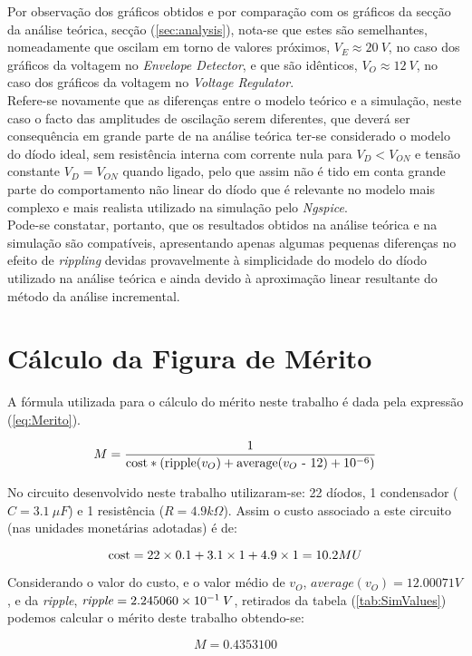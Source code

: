 Por observação dos gráficos obtidos e por comparação com os gráficos da secção da análise teórica, secção (\ref{sec:analysis}), nota-se que estes são semelhantes,
nomeadamente que oscilam em torno de valores próximos, $V_E \approx 20 \: V$, no caso dos gráficos da voltagem no \emph{Envelope Detector}, e que são idênticos, $V_O \approx 12 \: V$,
no caso dos gráficos da voltagem no \emph{Voltage Regulator}.
\\
Refere-se novamente que as diferenças entre o modelo teórico e a simulação, neste caso o facto das amplitudes de oscilação serem diferentes, que deverá ser consequência em grande parte
de na análise teórica ter-se considerado o modelo do díodo ideal, sem resistência interna com corrente nula para $V_D < V_{ON}$ e tensão constante $V_D = V_{ON}$ quando ligado, 
pelo que assim não é tido em conta grande parte do comportamento não linear do díodo que é relevante no modelo mais complexo e mais realista utilizado na simulação pelo \emph{Ngspice}.
\\
Pode-se constatar, portanto, que os resultados obtidos na análise teórica e na simulação são compatíveis, apresentando apenas algumas pequenas diferenças no
efeito de \emph{rippling} devidas provavelmente à simplicidade do modelo do díodo utilizado na análise teórica e ainda devido à aproximação linear resultante do método da análise incremental.



\section{Cálculo da Figura de Mérito}
\label{sec:Merit}

A fórmula utilizada para o cálculo do mérito neste trabalho é dada pela expressão (\ref{eq:Merito}).

\begin{equation}
    M = \frac{1}{\textnormal{cost} * (\textnormal{ripple($v_O$)} + \textnormal{average($v_O$ - 12)} + 10^{-6})}
    \label{eq:Merito}
\end{equation}

No circuito desenvolvido neste trabalho utilizaram-se: 22 díodos, 1 condensador ($C = 3.1\: \mu F$) e 1 resistência ($R = 4.9 k\Omega$). 
Assim o custo associado a este circuito (nas unidades monetárias adotadas) é de:

\begin{equation}
  \label{eq:Custo}
  \textnormal{cost} = 22 \times 0.1 + 3.1 \times 1 + 4.9 \times 1 = 10.2 MU 
\end{equation}

Considerando o valor do custo, e o valor médio de $v_O$, $average(v_O) = 12.00071 V$, e da \emph{ripple},
$\textnormal{\emph{ripple}} = 2.245060 \times 10^{-1} \:V$, retirados da tabela (\ref{tab:SimValues})
podemos calcular o mérito deste trabalho obtendo-se:

\begin{equation}
  \label{eq:ValorMerito}
  M = 0.4353100 
\end{equation}

